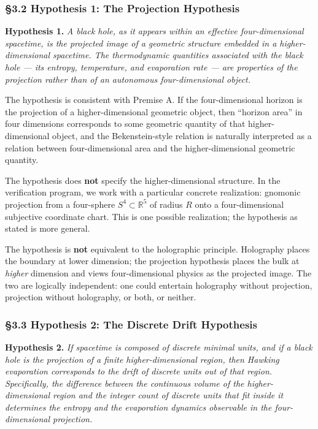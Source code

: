\documentclass[a4paper,11pt]{article}
\theoremstyle{definition}
\begin{document}
\subsubsection{§3.2 Hypothesis 1: The Projection
Hypothesis}\label{hypothesis-1-the-projection-hypothesis}

\textbf{Hypothesis 1.} \emph{A black hole, as it appears within an
effective four-dimensional spacetime, is the projected image of a
geometric structure embedded in a higher-dimensional spacetime. The
thermodynamic quantities associated with the black hole --- its entropy,
temperature, and evaporation rate --- are properties of the projection
rather than of an autonomous four-dimensional object.}

The hypothesis is consistent with Premise A. If the four-dimensional
horizon is the projection of a higher-dimensional geometric object, then
``horizon area'' in four dimensions corresponds to some geometric
quantity of that higher-dimensional object, and the Bekenstein-style
relation is naturally interpreted as a relation between four-dimensional
area and the higher-dimensional geometric quantity.

The hypothesis does \textbf{not} specify the higher-dimensional
structure. In the verification program, we work with a particular
concrete realization: gnomonic projection from a four-sphere
\(S^4 \subset \mathbb{R}^5\) of radius \(R\) onto a four-dimensional
subjective coordinate chart. This is one possible realization; the
hypothesis as stated is more general.

The hypothesis is \textbf{not} equivalent to the holographic principle.
Holography places the boundary at lower dimension; the projection
hypothesis places the bulk at \emph{higher} dimension and views
four-dimensional physics as the projected image. The two are logically
independent: one could entertain holography without projection,
projection without holography, or both, or neither.

\subsubsection{§3.3 Hypothesis 2: The Discrete Drift
Hypothesis}\label{hypothesis-2-the-discrete-drift-hypothesis}

\textbf{Hypothesis 2.} \emph{If spacetime is composed of discrete
minimal units, and if a black hole is the projection of a finite
higher-dimensional region, then Hawking evaporation corresponds to the
drift of discrete units out of that region. Specifically, the difference
between the continuous volume of the higher-dimensional region and the
integer count of discrete units that fit inside it determines the
entropy and the evaporation dynamics observable in the four-dimensional
projection.}
\end{document}
